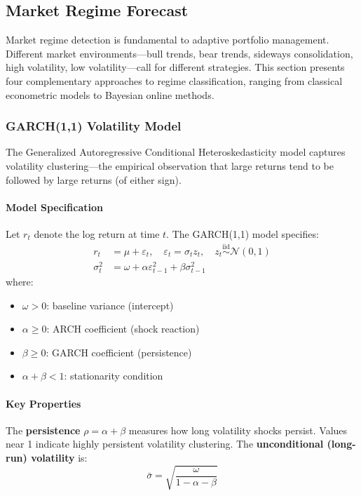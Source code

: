 \subsection{Market Regime Forecast}

Market regime detection is fundamental to adaptive portfolio management. Different market environments---bull trends, bear trends, sideways consolidation, high volatility, low volatility---call for different strategies. This section presents four complementary approaches to regime classification, ranging from classical econometric models to Bayesian online methods.

\subsubsection{GARCH(1,1) Volatility Model}

The Generalized Autoregressive Conditional Heteroskedasticity model captures volatility clustering---the empirical observation that large returns tend to be followed by large returns (of either sign).

\paragraph{Model Specification}

Let $r_t$ denote the log return at time $t$. The GARCH(1,1) model specifies:
\begin{align}
  r_t &= \mu + \varepsilon_t, \quad \varepsilon_t = \sigma_t z_t, \quad z_t \stackrel{\text{iid}}{\sim} \mathcal{N}(0, 1) \\
  \sigma_t^2 &= \omega + \alpha \varepsilon_{t-1}^2 + \beta \sigma_{t-1}^2
\end{align}
where:
\begin{itemize}
  \item $\omega > 0$: baseline variance (intercept)
  \item $\alpha \geq 0$: ARCH coefficient (shock reaction)
  \item $\beta \geq 0$: GARCH coefficient (persistence)
  \item $\alpha + \beta < 1$: stationarity condition
\end{itemize}

\paragraph{Key Properties}

The \textbf{persistence} $\rho = \alpha + \beta$ measures how long volatility shocks persist. Values near 1 indicate highly persistent volatility clustering. The \textbf{unconditional (long-run) volatility} is:
\begin{equation}
  \bar{\sigma} = \sqrt{\frac{\omega}{1 - \alpha - \beta}}
\end{equation}

